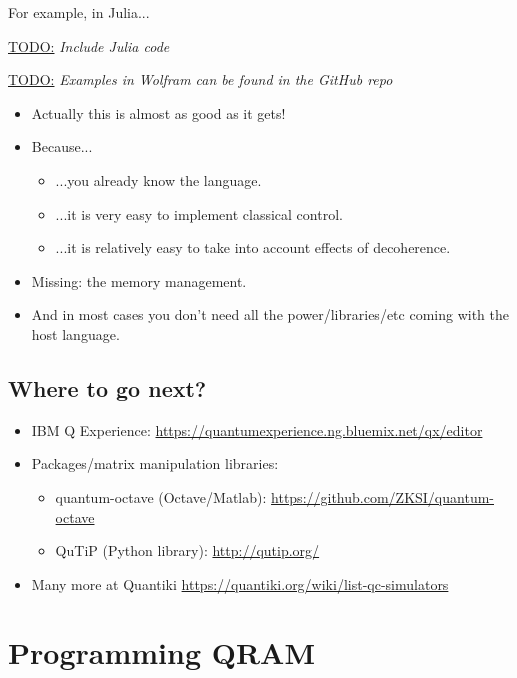 \documentclass[a4paper,11pt]{article}
\newcommand{\todo}[1]{%
    \par\vspace{6pt}\noindent\underline{\textsc{TODO:}} \emph{#1}\vspace{6pt}%
}
\begin{document}
For example, in Julia... \\[12pt] 


\todo{Include Julia code}

\todo{Examples in Wolfram can be found in the GitHub repo}


\begin{itemize}
\item Actually this is almost as good as it gets!
\item Because...
\begin{itemize}
\item ...you already know the language.
\item ...it is very easy to implement 
classical control.
\item ...it is relatively easy to take into account effects of 
decoherence.
\end{itemize}
\item Missing: the memory management.
\item And in most cases you don't need all the power/libraries/etc 
coming with the host language.
\end{itemize}


\subsection{Where to go next?}

\begin{itemize}
\item IBM Q Experience: 
{\small\url{https://quantumexperience.ng.bluemix.net/qx/editor}}
\item Packages/matrix manipulation libraries:
\begin{itemize}
\item quantum-octave (Octave/Matlab): 
{\small \url{https://github.com/ZKSI/quantum-octave}}
\item QuTiP (Python library): {\small\url{http://qutip.org/}}
\end{itemize}
\item Many more at Quantiki 
\url{https://quantiki.org/wiki/list-qc-simulators}
\end{itemize}



\section{Programming QRAM}
\end{document}

